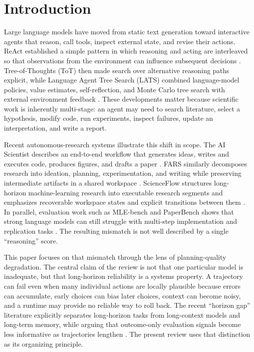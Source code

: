 \documentclass[manuscript,screen]{acmart}
\begin{document}
\section{Introduction}\label{sec:introduction}
Large language models have moved from static text generation toward interactive agents that reason, call tools, inspect external state, and revise their actions. ReAct established a simple pattern in which reasoning and acting are interleaved so that observations from the environment can influence subsequent decisions \cite{yao2023react}. Tree-of-Thoughts (ToT) then made search over alternative reasoning paths explicit, while Language Agent Tree Search (LATS) combined language-model policies, value estimates, self-reflection, and Monte Carlo tree search with external environment feedback \cite{yao2023tot,zhou2023lats}. These developments matter because scientific work is inherently multi-stage: an agent may need to search literature, select a hypothesis, modify code, run experiments, inspect failures, update an interpretation, and write a report.

Recent autonomous-research systems illustrate this shift in scope. The AI Scientist describes an end-to-end workflow that generates ideas, writes and executes code, produces figures, and drafts a paper \cite{lu2024aiscientist}. FARS similarly decomposes research into ideation, planning, experimentation, and writing while preserving intermediate artifacts in a shared workspace \cite{tang2026fars}. ScienceFlow structures long-horizon machine-learning research into executable research segments and emphasizes recoverable workspace states and explicit transitions between them \cite{zhao2026scienceflow}. In parallel, evaluation work such as MLE-bench and PaperBench shows that strong language models can still struggle with multi-step implementation and replication tasks \cite{chan2024mlebench,starace2025paperbench}. The resulting mismatch is not well described by a single ``reasoning'' score.

This paper focuses on that mismatch through the lens of planning-quality degradation. The central claim of the review is not that one particular model is inadequate, but that long-horizon reliability is a systems property. A trajectory can fail even when many individual actions are locally plausible because errors can accumulate, early choices can bias later choices, context can become noisy, and a runtime may provide no reliable way to roll back. The recent ``horizon gap'' literature explicitly separates long-horizon tasks from long-context models and long-term memory, while arguing that outcome-only evaluation signals become less informative as trajectories lengthen \cite{chen2026horizongap}. The present review uses that distinction as its organizing principle.
\end{document}
